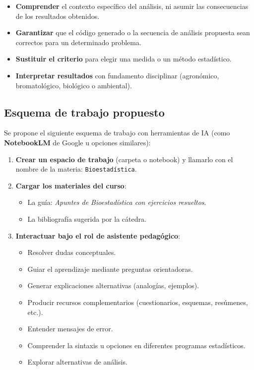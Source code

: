\documentclass[
  spanish,
  letterpaper,
  DIV=11,
  numbers=noendperiod]{scrreprt}
\providecommand{\tightlist}{%
  \setlength{\itemsep}{0pt}\setlength{\parskip}{0pt}}
\begin{document}
\begin{itemize}
\tightlist
\item
  \textbf{Comprender} el contexto específico del análisis, ni asumir las
  consecuencias de los resultados obtenidos.
\item
  \textbf{Garantizar} que el código generado o la secuencia de análisis
  propuesta sean correctos para un determinado problema.
\item
  \textbf{Sustituir el criterio} para elegir una medida o un método
  estadístico.
\item
  \textbf{Interpretar resultados} con fundamento disciplinar
  (agronómico, bromatológico, biológico o ambiental).
\end{itemize}

\subsection{Esquema de trabajo
propuesto}\label{esquema-de-trabajo-propuesto}

Se propone el siguiente esquema de trabajo con herramientas de IA (como
\textbf{NotebookLM} de Google u opciones similares):

\begin{enumerate}
\def\labelenumi{\arabic{enumi}.}
\tightlist
\item
  \textbf{Crear un espacio de trabajo} (carpeta o notebook) y llamarlo
  con el nombre de la materia: \texttt{Bioestadística}.
\item
  \textbf{Cargar los materiales del curso}:

  \begin{itemize}
  \tightlist
  \item
    La guía: \emph{Apuntes de Bioestadística con ejercicios resueltos}.
  \item
    La bibliografía sugerida por la cátedra.
  \end{itemize}
\item
  \textbf{Interactuar bajo el rol de asistente pedagógico}:

  \begin{itemize}
  \tightlist
  \item
    Resolver dudas conceptuales.
  \item
    Guiar el aprendizaje mediante preguntas orientadoras.
  \item
    Generar explicaciones alternativas (analogías, ejemplos).
  \item
    Producir recursos complementarios (cuestionarios, esquemas,
    resúmenes, etc.).
  \item
    Entender mensajes de error.
  \item
    Comprender la sintaxis u opciones en diferentes programas
    estadísticos.
  \item
    Explorar alternativas de análisis.
  \end{itemize}
\end{enumerate}
\end{document}
